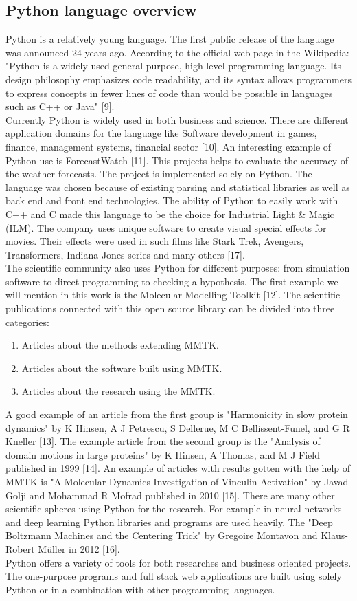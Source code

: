 \documentclass [twoside,
  11pt, a4paper,
  footinclude=true,
  headinclude=true,
  cleardoublepage=empty
]{article}
\begin{document}
\newpage
\subsection{Python language overview}
Python is a relatively young language. The first public release of the language was announced 24 years ago. According to the official web page in the Wikipedia: "Python is a widely used general-purpose, high-level programming language. Its design philosophy emphasizes code readability, and its syntax allows programmers to express concepts in fewer lines of code than would be possible in languages such as C++ or Java" [9].\\
Currently Python is widely used in both business and science. There are different application domains for the language like Software development in games, finance, management systems, financial sector [10]. An interesting example of Python use is ForecastWatch [11]. This projects helps to evaluate the accuracy of the weather forecasts. The project is implemented solely on Python. The language was chosen because of existing parsing and statistical libraries as well as back end and front end technologies. The ability of Python to easily work with C++ and C made this language to be the choice for Industrial Light & Magic (ILM). The company uses unique software to create visual special effects for movies. Their effects were used in such films like Stark Trek, Avengers, Transformers, Indiana Jones series and many others [17].\\
The scientific community also uses Python for different purposes: from simulation software to direct programming to checking a hypothesis. The first example we will mention in this work is the Molecular Modelling Toolkit [12]. The scientific publications connected with this open source library can be divided into three categories:
\begin{enumerate}
    \item Articles about the methods extending MMTK.
    \item Articles about the software built using MMTK.
    \item Articles about the research using the MMTK.
\end{enumerate}
A good example of an article from the first group is "Harmonicity in slow protein dynamics" by K Hinsen, A J Petrescu, S Dellerue, M C Bellissent-Funel, and G R Kneller [13]. The example article from the second group is the "Analysis of domain motions in large proteins" by K Hinsen, A Thomas, and M J Field published in 1999 [14]. An example of articles with results gotten with the help of MMTK is "A Molecular Dynamics Investigation of Vinculin Activation" by Javad Golji and Mohammad R Mofrad published in 2010 [15]. There are many other scientific spheres using Python for the research. For example in neural networks and deep learning Python libraries and programs are used heavily. The "Deep Boltzmann Machines and the Centering Trick" by Gregoire Montavon and Klaus-Robert Müller in 2012 [16].\\
Python offers a variety of tools for both researches and business oriented projects. The one-purpose programs and full stack web applications are built using solely Python or in a combination with other programming languages. 
\end{document}
